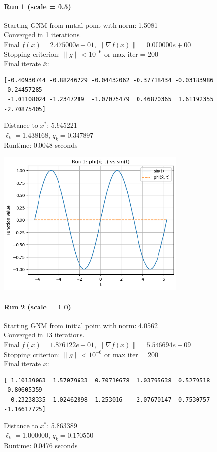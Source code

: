 \documentclass[12pt]{article}
\begin{document}
\paragraph{Run 1 (scale = 0.5)}
Starting GNM from initial point with norm: 1.5081\\
Converged in 1 iterations.\\
Final $f(x) = 2.475000e+01$, $\|\nabla f(x)\| = 0.000000e+00$\\
Stopping criterion: $\|g\| < 10^{-6}$ or max iter = 200\\
Final iterate $\bar{x}$:
\begin{verbatim}
[-0.40930744 -0.88246229 -0.04432062 -0.37718434 -0.03183986 -0.24457285
 -1.01108024 -1.2347289  -1.07075479  0.46870365  1.61192355 -2.70875405]
\end{verbatim}
Distance to $x^*$: 5.945221\\
$\ell_k = 1.438168$, $q_k = 0.347897$\\
Runtime: 0.0048 seconds

\includegraphics[width=0.7\textwidth]{figures/plot_6.png}

\paragraph{Run 2 (scale = 1.0)}
Starting GNM from initial point with norm: 4.0562\\
Converged in 13 iterations.\\
Final $f(x) = 1.876122e+01$, $\|\nabla f(x)\| = 5.546694e-09$\\
Stopping criterion: $\|g\| < 10^{-6}$ or max iter = 200\\
Final iterate $\bar{x}$:
\begin{verbatim}
[ 1.10139063  1.57079633  0.70710678 -1.03795638 -0.5279518  -0.80605359
 -0.23238335 -1.02462898 -1.253016   -2.07670147 -0.7530757  -1.16617725]
\end{verbatim}
Distance to $x^*$: 5.863389\\
$\ell_k = 1.000000$, $q_k = 0.170550$\\
Runtime: 0.0476 seconds
\end{document}
